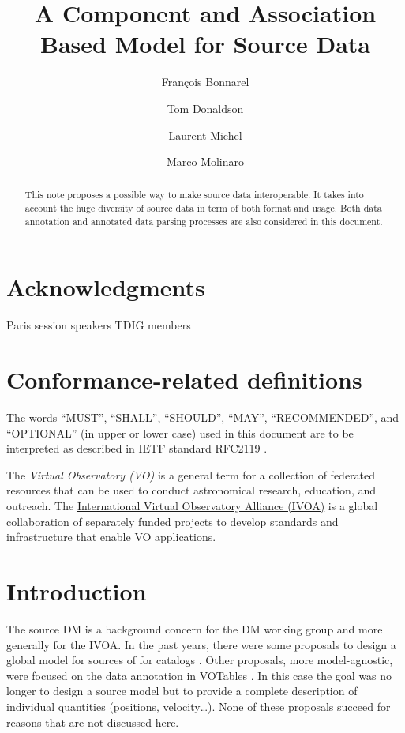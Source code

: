\documentclass[11pt,a4paper]{ivoa}
\title{A Component and Association Based Model for Source Data}
\author[http://wiki.ivoa.net/twiki/bin/view/IVOA/FrancoisBonnarel]{François Bonnarel}
\author[http://wiki.ivoa.net/twiki/bin/view/IVOA/TomDonaldson]{Tom Donaldson}
\author[http://wiki.ivoa.net/twiki/bin/view/IVOA/LaurentMichel]{Laurent Michel}
\author[http://wiki.ivoa.net/twiki/bin/view/IVOA/MarcoMolinaro]{Marco Molinaro}
\begin{document}
\begin{abstract}
This note proposes a possible way to make source data interoperable. It takes into account the huge diversity of source data in term of both format and usage. Both data annotation and annotated data parsing processes are also considered in this document.
\end{abstract}


\section*{Acknowledgments}

Paris session speakers TDIG members

\section*{Conformance-related definitions}

The words ``MUST'', ``SHALL'', ``SHOULD'', ``MAY'', ``RECOMMENDED'', and
``OPTIONAL'' (in upper or lower case) used in this document are to be
interpreted as described in IETF standard RFC2119 \citep{std:RFC2119}.

The \emph{Virtual Observatory (VO)} is a
general term for a collection of federated resources that can be used
to conduct astronomical research, education, and outreach.
The \href{http://www.ivoa.net}{International
Virtual Observatory Alliance (IVOA)} is a global
collaboration of separately funded projects to develop standards and
infrastructure that enable VO applications.


\section{Introduction}

The source DM is a background concern for the DM working group and more generally for the IVOA.
In the past years, there were some proposals to design a global model for sources \citep{wd:jesusdm} of for catalogs \citep{wd:catalog}.
Other proposals, more model-agnostic, were focused on the data annotation in VOTables \citep{note:stcvot} \citep{note:seb}. In this case the goal was no longer to design a source model but to provide a complete description of  individual quantities (positions, velocity…).
None of these proposals succeed for reasons that are not discussed here. 
\end{document}

